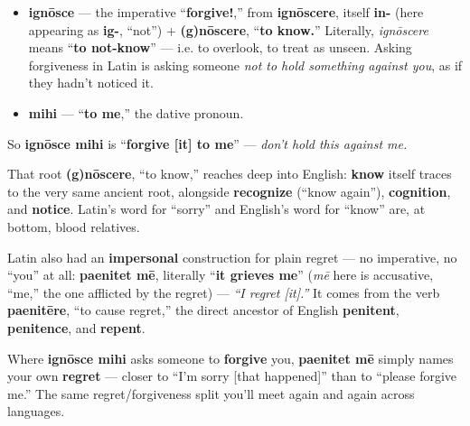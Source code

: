 \begin{cousinweb}
\begin{itemize}
\raggedright
  \item \textbf{ignōsce} — the imperative \textquotedblleft{}\textbf{forgive!},\textquotedblright{} from \textbf{ignōscere}, itself \textbf{in-} (here appearing as \textbf{ig-}, \textquotedblleft{}not\textquotedblright{}) + \textbf{(g)nōscere}, \textquotedblleft{}\textbf{to know.}\textquotedblright{} Literally, \emph{ignōscere} means \textquotedblleft{}\textbf{to not-know}\textquotedblright{} — i.e. to overlook, to treat as unseen. Asking forgiveness in Latin is asking someone \emph{not to hold something against you}, as if they hadn't noticed it.
  \item \textbf{mihi} — \textquotedblleft{}\textbf{to me},\textquotedblright{} the dative pronoun.
\end{itemize}

So \textbf{ignōsce mihi} is \textquotedblleft{}\textbf{forgive {[}it{]} to me}\textquotedblright{} — \emph{don't hold this against me.}

That root \textbf{(g)nōscere}, \textquotedblleft{}to know,\textquotedblright{} reaches deep into English: \textbf{know} itself traces to the very same ancient root, alongside \textbf{recognize} (\textquotedblleft{}know again\textquotedblright{}), \textbf{cognition}, and \textbf{notice}. Latin's word for \textquotedblleft{}sorry\textquotedblright{} and English's word for \textquotedblleft{}know\textquotedblright{} are, at bottom, blood relatives.
\end{cousinweb}

\begin{culture}
Latin also had an \textbf{impersonal} construction for plain regret — no imperative, no \textquotedblleft{}you\textquotedblright{} at all: \textbf{paenitet mē}, literally \textquotedblleft{}\textbf{it grieves me}\textquotedblright{} (\emph{mē} here is accusative, \textquotedblleft{}me,\textquotedblright{} the one afflicted by the regret) — \emph{\textquotedblleft{}I regret {[}it{]}.\textquotedblright{}} It comes from the verb \textbf{paenitēre}, \textquotedblleft{}to cause regret,\textquotedblright{} the direct ancestor of English \textbf{penitent}, \textbf{penitence}, and \textbf{repent}.

Where \textbf{ignōsce mihi} asks someone to \textbf{forgive} you, \textbf{paenitet mē} simply names your own \textbf{regret} — closer to \textquotedblleft{}I'm sorry {[}that happened{]}\textquotedblright{} than to \textquotedblleft{}please forgive me.\textquotedblright{} The same regret/forgiveness split you'll meet again and again across languages.
\end{culture}

